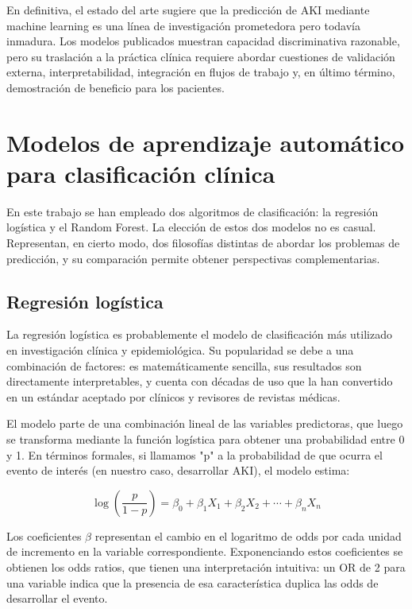 \documentclass[12pt, a4paper, oneside]{report}
\begin{document}
En definitiva, el estado del arte sugiere que la predicción de AKI mediante machine learning es una línea de investigación prometedora pero todavía inmadura. Los modelos publicados muestran capacidad discriminativa razonable, pero su traslación a la práctica clínica requiere abordar cuestiones de validación externa, interpretabilidad, integración en flujos de trabajo y, en último término, demostración de beneficio para los pacientes.

\section{Modelos de aprendizaje automático para clasificación clínica}

En este trabajo se han empleado dos algoritmos de clasificación: la regresión logística y el Random Forest. La elección de estos dos modelos no es casual. Representan, en cierto modo, dos filosofías distintas de abordar los problemas de predicción, y su comparación permite obtener perspectivas complementarias.

\subsection{Regresión logística}

La regresión logística es probablemente el modelo de clasificación más utilizado en investigación clínica y epidemiológica. Su popularidad se debe a una combinación de factores: es matemáticamente sencilla, sus resultados son directamente interpretables, y cuenta con décadas de uso que la han convertido en un estándar aceptado por clínicos y revisores de revistas médicas.

El modelo parte de una combinación lineal de las variables predictoras, que luego se transforma mediante la función logística para obtener una probabilidad entre 0 y 1. En términos formales, si llamamos "p" a la probabilidad de que ocurra el evento de interés (en nuestro caso, desarrollar AKI), el modelo estima:

\begin{equation}
\log\left(\frac{p}{1-p}\right) = \beta_0 + \beta_1 X_1 + \beta_2 X_2 + \cdots + \beta_n X_n
\end{equation}

Los coeficientes $\beta$ representan el cambio en el logaritmo de odds por cada unidad de incremento en la variable correspondiente. Exponenciando estos coeficientes se obtienen los odds ratios, que tienen una interpretación intuitiva: un OR de 2 para una variable indica que la presencia de esa característica duplica las odds de desarrollar el evento.
\end{document}
